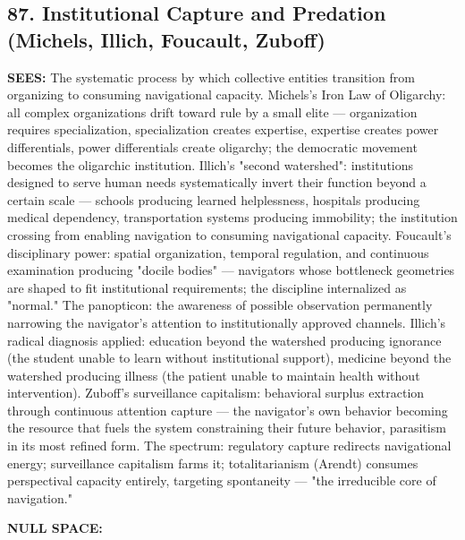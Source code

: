 \subsection*{87. Institutional Capture and Predation (Michels, Illich, Foucault, Zuboff)}


\textbf{SEES:} The systematic process by which collective entities transition from organizing to consuming navigational capacity. Michels's Iron Law of Oligarchy: all complex organizations drift toward rule by a small elite — organization requires specialization, specialization creates expertise, expertise creates power differentials, power differentials create oligarchy; the democratic movement becomes the oligarchic institution. Illich's "second watershed": institutions designed to serve human needs systematically invert their function beyond a certain scale — schools producing learned helplessness, hospitals producing medical dependency, transportation systems producing immobility; the institution crossing from enabling navigation to consuming navigational capacity. Foucault's disciplinary power: spatial organization, temporal regulation, and continuous examination producing "docile bodies" — navigators whose bottleneck geometries are shaped to fit institutional requirements; the discipline internalized as "normal." The panopticon: the awareness of possible observation permanently narrowing the navigator's attention to institutionally approved channels. Illich's radical diagnosis applied: education beyond the watershed producing ignorance (the student unable to learn without institutional support), medicine beyond the watershed producing illness (the patient unable to maintain health without intervention). Zuboff's surveillance capitalism: behavioral surplus extraction through continuous attention capture — the navigator's own behavior becoming the resource that fuels the system constraining their future behavior, parasitism in its most refined form. The spectrum: regulatory capture redirects navigational energy; surveillance capitalism farms it; totalitarianism (Arendt) consumes perspectival capacity entirely, targeting spontaneity — "the irreducible core of navigation."


\textbf{NULL SPACE:}

